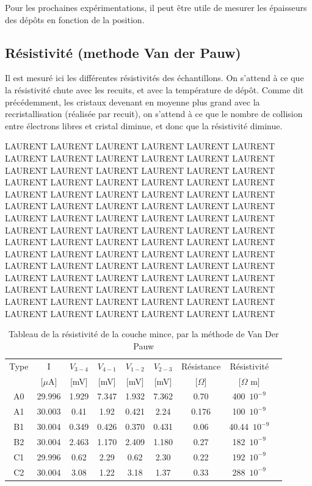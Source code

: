 \documentclass[a4paper,12pt,oneside]{article}
\begin{document}
Pour les prochaines expérimentations, il peut être utile de mesurer les épaisseurs des dépôts en fonction de la position.

\subsection{Résistivité (methode Van der Pauw)}

Il est mesuré ici les différentes résistivités des échantillons. On s'attend à ce que la résistivité chute avec les recuits, et avec la température de dépôt. Comme dit précédemment, les cristaux devenant en moyenne plus grand avec la recristallisation (réalisée par recuit), on s'attend à ce que le nombre de collision entre électrons libres et cristal diminue, et donc que la résistivité diminue.


LAURENT LAURENT LAURENT LAURENT LAURENT LAURENT LAURENT LAURENT LAURENT LAURENT LAURENT LAURENT LAURENT LAURENT LAURENT LAURENT LAURENT LAURENT LAURENT LAURENT LAURENT LAURENT LAURENT LAURENT LAURENT LAURENT LAURENT LAURENT LAURENT LAURENT LAURENT LAURENT LAURENT LAURENT LAURENT LAURENT LAURENT LAURENT LAURENT LAURENT LAURENT LAURENT LAURENT LAURENT LAURENT LAURENT LAURENT LAURENT LAURENT LAURENT LAURENT LAURENT LAURENT LAURENT LAURENT LAURENT LAURENT LAURENT LAURENT LAURENT LAURENT LAURENT LAURENT LAURENT LAURENT LAURENT LAURENT LAURENT LAURENT LAURENT LAURENT LAURENT LAURENT LAURENT LAURENT LAURENT LAURENT LAURENT LAURENT LAURENT LAURENT LAURENT LAURENT LAURENT LAURENT LAURENT LAURENT LAURENT LAURENT LAURENT 

\begin{table}[ht]
\centering
   \begin{tabular}{|c|c|c|c|c|c|c|c|c|}
	  \hline
	  Type & I & $V_{3-4}$ & $V_{4-1}$ & $V_{1-2}$ & $V_{2-3}$ & Résistance& Résistivité\\
	  &  [$\mu$A] & [mV] & [mV] & [mV] & [mV] & [$\Omega$] & [$\Omega$ m] \\
	  \hline
	  A0 & 29.996 & 1.929 & 7.347 & 1.932 & 7.362 & 0.70 & 400\ $10^{-9}$\\
	  A1 & 30.003 & 0.41 & 1.92 & 0.421 & 2.24 & 0.176 & 100\ $10^{-9}$\\
	  B1 & 30.004 & 0.349 & 0.426 & 0.370 & 0.431 & 0.06 & 40.44\ $10^{-9}$\\
	  B2 & 30.004 & 2.463 & 1.170 & 2.409 & 1.180 & 0.27 & 182\ $10^{-9}$\\
	  C1 & 29.996 & 0.62 & 2.29 & 0.62 & 2.30 & 0.22 & 192\ $10^{-9}$\\
	  C2 & 30.004 & 3.08 & 1.22 & 3.18 & 1.37 & 0.33 & 288\ $10^{-9}$\\
	  \hline
   \end{tabular}
   \caption{Tableau de la résistivité de la couche mince, par la méthode de Van Der Pauw}\label{tab:vanderpauw}
\end{table}
\end{document}
